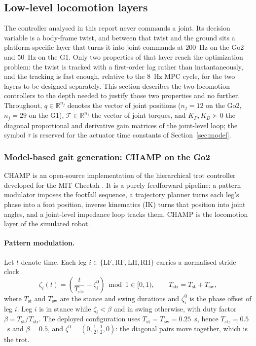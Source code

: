 \documentclass[11pt,a4paper]{article}
\newcommand{\R}{\mathbb{R}}
\newcommand{\Tstr}{T_{\mathrm{str}}}
\newcommand{\Tst}{T_{\mathrm{st}}}
\newcommand{\Tsw}{T_{\mathrm{sw}}}
\begin{document}
\subsection{Low-level locomotion layers}
\label{sec:lowlevel}

The controller analysed in this report never commands a joint. Its decision variable is a body-frame twist,
and between that twist and the ground sits a platform-specific layer that turns it into joint commands at
$200$~Hz on the Go2 and $50$~Hz on the G1. Only two properties of that layer reach the optimization problem:
the twist is tracked with a first-order lag rather than instantaneously, and the tracking is fast enough,
relative to the $8$~Hz MPC cycle, for the two layers to be designed separately. This section describes the
two locomotion controllers to the depth needed to justify those two properties and no further. Throughout, $q\in\R^{n_j}$
denotes the vector of joint positions ($n_j=12$ on the Go2, $n_j=29$ on the G1), $\mathcal{T}\in\R^{n_j}$ the
vector of joint torques, and $K_P,K_D\succ0$ the diagonal proportional and derivative gain matrices of the
joint-level loop; the symbol $\tau$ is reserved for the actuator time constants of
Section~\ref{sec:model}.

\subsubsection{Model-based gait generation: CHAMP on the Go2}
\label{sec:champ}

CHAMP \cite{champ} is an open-source implementation of the hierarchical trot controller developed for the MIT
Cheetah \cite{lee2013hierarchical,hyun2014trot}. It is a purely feedforward pipeline: a pattern modulator
imposes the footfall sequence, a trajectory planner turns each leg's phase into a foot position, inverse
kinematics (IK) turns that position into joint angles, and a joint-level impedance loop tracks them. CHAMP is the locomotion layer of the simulated robot.

\paragraph{Pattern modulation.} Let $t$ denote time. Each leg $i\in\{\mathrm{LF},\mathrm{RF},\mathrm{LH},
\mathrm{RH}\}$ carries a normalised stride clock
\begin{equation}
  \zeta_i(t)=\left(\frac{t}{\Tstr}-\zeta_i^{0}\right)\bmod 1\in[0,1),
  \qquad \Tstr=\Tst+\Tsw,
  \label{eq:gaitphase}
\end{equation}
where $\Tst$ and $\Tsw$ are the stance and swing durations and $\zeta_i^{0}$ is the phase offset of leg $i$.
Leg $i$ is in stance while $\zeta_i<\beta$ and in swing otherwise, with duty factor $\beta=\Tst/\Tstr$. The
deployed configuration uses $\Tst=\Tsw=0.25$~s, hence $\Tstr=0.5$~s and $\beta=0.5$, and
$\zeta^{0}=(0,\tfrac12,\tfrac12,0)$: the diagonal pairs move together, which is the trot.
\end{document}
